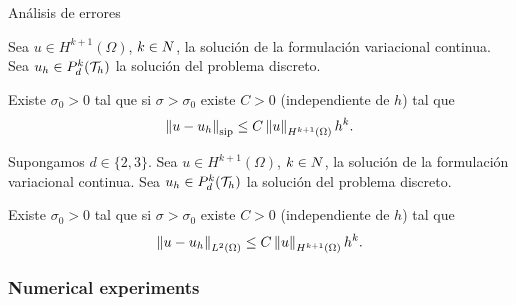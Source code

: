 \begin{frame}{Análisis de errores}
\begin{theorem}
	\label{theorem:eliptico_orden_norma_SIP}
	Sea $u\in H^{k+1}(\Omega)$, $k\in\relax N$, la solución de la formulación variacional continua. Sea $u_h\in\relax{P}_d^k(\mathcal{T}_h)$ la solución del problema discreto.
	
	Existe $\sigma_0>0$ tal que si $\sigma>\sigma_0$ existe $C>0$ (independiente de $h$) tal que $$\left\|u-u_h\right\|_{\text{sip}}\leq C\left\|u\right\|_{H^{k+1}(\Omega)}h^k.$$
\end{theorem}

%	

\begin{theorem}
	\label{corolario:eliptico_orden_norma_L2}
	Supongamos $d\in\{2,3\}$. Sea $u\in H^{k+1}(\Omega)$, $k\in\relax N$, la solución de la formulación variacional continua. Sea $u_h\in\relax{P}_d^k(\mathcal{T}_h)$ la solución del problema discreto.
	
	Existe $\sigma_0>0$ tal que si $\sigma>\sigma_0$ existe $C>0$ (independiente de $h$) tal que $$\left\|u-u_h\right\|_{L^2(\Omega)}\leq C\left\|u\right\|_{H^{k+1}(\Omega)}h^k.$$
\end{theorem}
\end{frame}

	\subsubsection{Numerical experiments}

